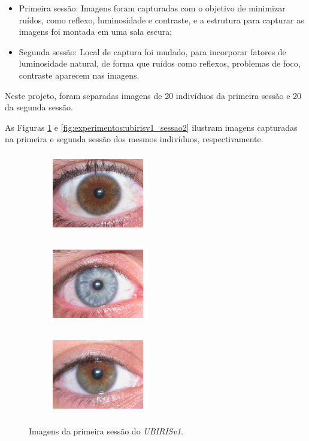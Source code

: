 \begin{itemize}
    \item Primeira sessão: Imagens foram capturadas com o objetivo de minimizar ruídos, como reflexo, luminosidade e contraste, e a estrutura para capturar as imagens foi montada em uma sala escura;
    \item Segunda sessão: Local de captura foi mudado, para incorporar fatores de luminosidade natural, de forma que ruídos como reflexos, problemas de foco, contraste aparecem nas imagens.
\end{itemize}

\par Neste projeto, foram separadas imagens de 20 indivíduos da primeira sessão e 20 da segunda sessão.

\par As Figuras \ref{fig:experimentos:ubirisv1_sessao1} e \ref{fig:experimentos:ubirisv1_sessao2} ilustram imagens capturadas na primeira e segunda sessão dos mesmos indivíduos, respectivamente.

\begin{figure}[h!]
\begin{subfigure}{.3\textwidth}
\centering
\includegraphics[width=4cm,height=3.5cm]{img/Resultados/ubirisv1/sessao1_1.jpg}
\end{subfigure}\hfill
\begin{subfigure}{.3\textwidth}
\centering
\includegraphics[width=4cm,height=3.5cm]{img/Resultados/ubirisv1/sessao1_55.jpg}
\end{subfigure}\hfill
\begin{subfigure}{.3\textwidth}
\centering
\includegraphics[width=4cm,height=3.5cm]{img/Resultados/ubirisv1/sessao1_76.jpg}
\end{subfigure}
\caption{Imagens da primeira sessão do \textit{UBIRISv1}.}
\label{fig:experimentos:ubirisv1_sessao1}
\end{figure}

